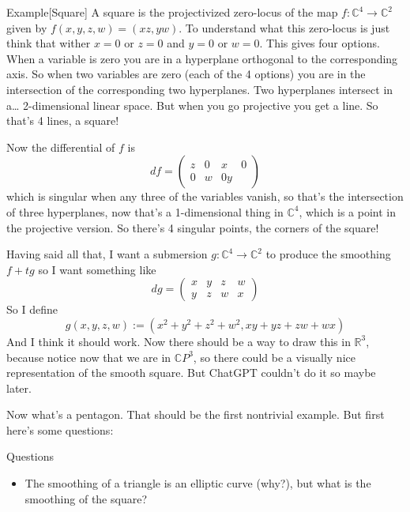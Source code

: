 \begin{thing8}{Example}[Square]\leavevmode
	A square is the projectivized zero-locus of the map \(f:\mathbb{C}^4 \to \mathbb{C}^2\) given by \(f(x,y,z,w)=(xz,yw)\). To understand what this zero-locus is just think that wither \(x=0\) or \(z=0\) and  \(y=0\) or  \(w=0\). This gives four options. When a variable is zero you are in a hyperplane orthogonal to the corresponding axis. So when two variables are zero (each of the 4 options) you are in the intersection of the corresponding two hyperplanes. Two hyperplanes intersect in a… 2-dimensional linear space. But when you go projective you get a line. So that's 4 lines, a square!

	Now the differential of  \(f\) is
	\[df=\begin{pmatrix} z & 0 & x & 0 \\ 0 & w & 0 y \end{pmatrix} \]
	which is singular when any three of the variables vanish, so that's the intersection of three hyperplanes, now that's a 1-dimensional thing in \(\mathbb{C}^4\), which is a point in the projective version. So there's 4 singular points, the corners of the square!

	Having said all that, I want a submersion \(g:\mathbb{C}^4\to \mathbb{C}^2\) to produce the smoothing \(f+tg\) so I want something like
	\[dg=\begin{pmatrix} x&y&z&w\\y&z&w&x \end{pmatrix} \]
	So I define
	\[g(x,y,z,w):=(x^2+y^2+z^2+w^2,xy+yz+zw+wx)\]
And I think it should work. Now there should be a way to draw this in \(\mathbb{R}^3\), because notice now that we are in \(\mathbb{C}P^3\), so there could be a visually nice representation of the smooth square. But ChatGPT couldn't do it so maybe later.	
\end{thing8}

Now what's a pentagon. That should be the first nontrivial example. But first here's some questions:

\begin{thing6}{Questions}\leavevmode
\begin{itemize}
\item The smoothing of a triangle is an elliptic curve (why?), but what is the smoothing of the square?
\end{itemize}
\end{thing6}

